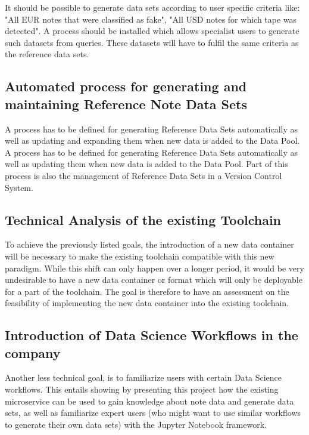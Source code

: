 It should be possible to generate data sets according to user specific criteria like: "All EUR notes that were classified as fake", "All USD notes for which tape was detected". 
A process should be installed which allows specialist users to generate such datasets from queries. These datasets will have to fulfil the same criteria as the reference data sets.

\subsection{Automated process for generating and maintaining Reference Note Data Sets}

A process has to be defined for generating Reference Data Sets automatically as well as updating and expanding them when new data is added to the Data Pool. A process has to be defined for generating Reference Data Sets automatically as well as updating them when new data is added to the Data Pool. Part of this process is also the management of Reference Data Sets in a Version Control System. 

\subsection{Technical Analysis of the existing Toolchain}

To achieve the previously listed goals, the introduction of a new data container will be necessary to make the existing toolchain compatible with this new paradigm. While this shift can only happen over a longer period, it would be very undesirable to have a new data container or format which will only be deployable for a part of the toolchain. The goal is therefore to have an assessment on the feasibility of implementing the new data container into the existing toolchain. 


\subsection{Introduction of Data Science Workflows in the company}
Another less technical goal, is to familiarize users with certain Data Science workflows. This entails showing by presenting this project how the existing microservice can be used to gain knowledge about note data and generate data sets, as well as familiarize expert users (who might want to use similar workflows to generate their own data sets) with the Jupyter Notebook framework.